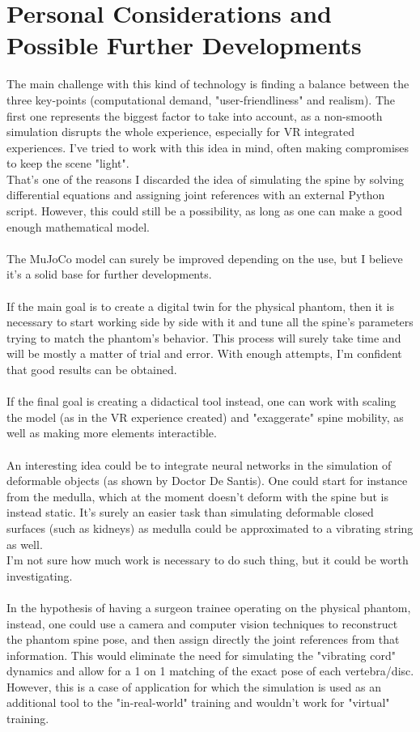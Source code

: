 \documentclass[a4paper, 12pt]{article}
\begin{document}
\section{Personal Considerations and Possible Further Developments}
The main challenge with this kind of technology is finding a balance between the three key-points (computational demand, "user-friendliness" and realism). The first one represents the biggest factor to take into account, as a non-smooth simulation disrupts the whole experience, especially for VR integrated experiences. I've tried to work with this idea in mind, often making compromises to keep the scene "light".
\\That's one of the reasons I discarded the idea of simulating the spine by solving differential equations and assigning joint references with an external Python script. However, this could still be a possibility, as long as one can make a good enough mathematical model. 
\\\\
The MuJoCo model can surely be improved depending on the use, but I believe it's a solid base for further developments. 
\\\\If the main goal is to create a digital twin for the physical phantom, then it is necessary to start working side by side with it and tune all the spine's parameters trying to match the phantom's behavior. This process will surely take time and will be mostly a matter of trial and error. With enough attempts, I'm confident that good results can be obtained.
\\\\If the final goal is creating a didactical tool instead, one can work with scaling the model (as in the VR experience created) and "exaggerate" spine mobility, as well as making more elements interactible.
\\\\An interesting idea could be to integrate neural networks in the simulation of deformable objects (as shown by Doctor De Santis). One could start for instance from the medulla, which at the moment doesn't deform with the spine but is instead static. It's surely an easier task than simulating deformable closed surfaces (such as kidneys) as medulla could be approximated to a vibrating string as well. 
\\I'm not sure how much work is necessary to do such thing, but it could be worth investigating.
\\\\In the hypothesis of having a surgeon trainee operating on the physical phantom, instead, one could use a camera and computer vision techniques to reconstruct the phantom spine pose, and then assign directly the joint references from that information. This would eliminate the need for simulating the "vibrating cord" dynamics and allow for a 1 on 1 matching of the exact pose of each vertebra/disc. However, this is a case of application for which the simulation is used as an additional tool to the "in-real-world" training and wouldn't work for "virtual" training.
\end{document}
